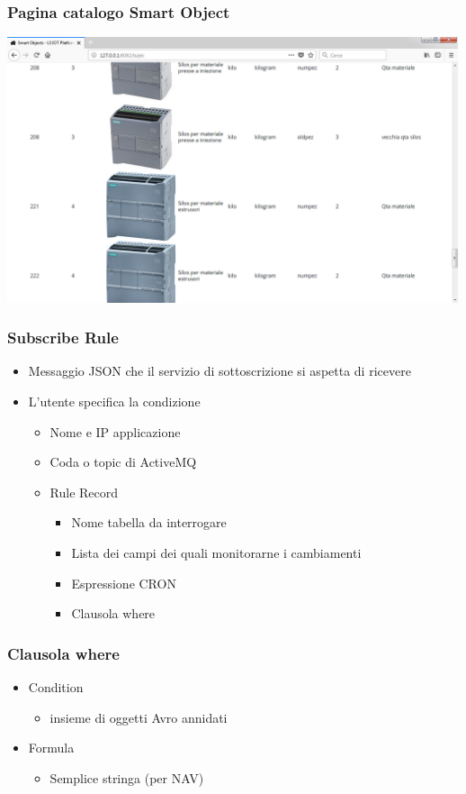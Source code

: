 \documentclass{beamer}
\begin{document}
\begin{frame}
\frametitle{Pagina catalogo Smart Object}
\includegraphics[width=1\textwidth]{images/SmartObjectsPlatform.png}
\end{frame}

\begin{frame}
\frametitle{Subscribe Rule}
\begin{itemize}
\item Messaggio JSON che il servizio di sottoscrizione si aspetta di ricevere
\item L'utente specifica la condizione
\begin{itemize}
\item Nome e IP applicazione
\item Coda o topic di ActiveMQ
\item Rule Record
\begin{itemize}
\item Nome tabella da interrogare
\item Lista dei campi dei quali monitorarne i cambiamenti
\item Espressione CRON
\item Clausola where

\end{itemize}
\end{itemize}
\end{itemize}
\end{frame}

\begin{frame}
\frametitle{Clausola where}
\begin{itemize}
\item Condition
\begin{itemize}
\item insieme di oggetti Avro annidati
\end{itemize}
\item Formula
\begin{itemize}
\item Semplice stringa (per NAV)
\end{itemize}
\end{itemize}
\end{frame}
\end{document}
